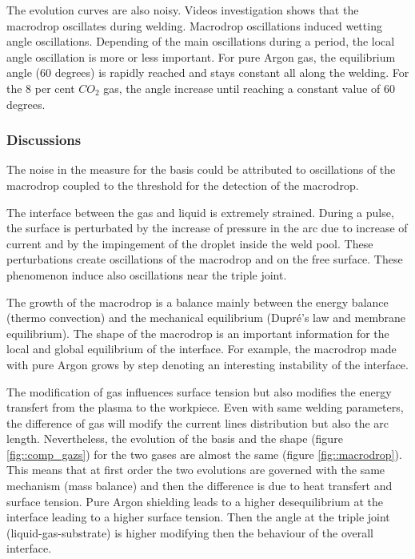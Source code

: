\documentclass[12pt]{iopart}
\begin{document}
The evolution curves are also noisy. Videos investigation shows that the macrodrop oscillates during welding. 
Macrodrop oscillations induced  wetting angle oscillations. Depending of the main oscillations during
a period, the local angle oscillation is more or less important. For pure Argon
gas, the equilibrium angle (60 degrees) is rapidly reached and stays constant all along the welding.
For the 8 per cent $CO_2$ gas, the angle increase until reaching a constant value of 60 degrees.

\subsubsection{Discussions}
The noise in the measure for the basis could be attributed
to oscillations of the macrodrop coupled to the threshold for the detection of the macrodrop.

The interface between the gas and liquid is extremely strained. During a pulse, the surface is perturbated by the
increase of pressure in the arc due to increase of current and by the impingement of the droplet inside the
weld pool. These perturbations create oscillations of the macrodrop and on the free surface.
 These phenomenon induce also oscillations near the triple joint.

 The growth of the macrodrop is a balance mainly between
the energy balance (thermo convection) and the mechanical equilibrium (Dupr\'e's law and membrane equilibrium). 
The shape of the macrodrop is an important information for
the local and global equilibrium of the interface. 
For example, the macrodrop made with  pure Argon grows by step denoting an interesting instability 
of the interface. 

The modification of gas influences surface tension but also modifies the energy transfert from the plasma
to the workpiece. Even with same welding parameters, 
the difference of gas will modify the current lines distribution but also the arc length.
Nevertheless, the evolution of the basis and the  shape 
(figure \ref{fig::comp_gazs}) for the two gases are almost the same (figure \ref{fig::macrodrop}).
 This means that at first order the two evolutions
are governed with the same mechanism (mass balance) and then the difference is due to heat transfert and surface tension.
Pure Argon shielding leads to a higher desequilibrium at the interface leading to a higher surface tension. Then the angle
at the triple joint (liquid-gas-substrate) is higher modifying then the behaviour of the overall interface.
\end{document}
